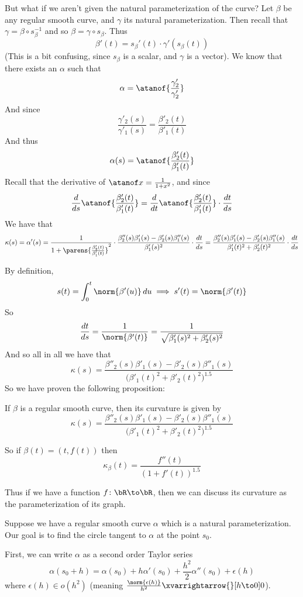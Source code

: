 But what if we aren't given the natural parameterization of the curve?
Let $\beta$ be any regular smooth curve, and $\gamma$ its natural parameterization.
Then recall that $\gamma=\beta\circ s_\beta^{-1}$ and so $\beta=\gamma\circ s_\beta$.
Thus
\[ \beta'(t) = s_\beta'(t)\cdot\gamma'(s_\beta(t)) \]
(This is a bit confusing, since $s_\beta$ is a scalar, and $\gamma$ is a vector).
We know that there exists an $\alpha$ such that
\[ \alpha = \atanof{\frac{\gamma'_2}{\gamma'_2}} \]
And since
\[ \frac{\gamma'_2(s)}{\gamma'_1(s)} = \frac{\beta'_2(t)}{\beta'_1(t)} \]
And thus
\[ \alpha(s) = \atanof{\frac{\beta'_2(t)}{\beta'_1(t)}} \]
Recall that the derivative of $\atanof x=\frac1{1+x^2}$, and since
\[ \frac d{ds}\atanof{\frac{\beta'_2(t)}{\beta'_1(t)}} = \frac d{dt}\atanof{\frac{\beta'_2(t)}{\beta'_1(t)}}\cdot\frac{dt}{ds} \]
We have that
\[ \kappa(s) = \alpha'(s) = \frac1{1+\parens{\frac{\beta'_2(t)}{\beta'_1(t)}}^2}\cdot\frac{\beta''_2(s)\beta'_1(s)-\beta'_2(s)\beta''_1(s)}{\beta'_1(s)^2}\cdot\frac{dt}{ds} =
\frac{\beta''_2(s)\beta'_1(s)-\beta'_2(s)\beta''_1(s)}{\beta'_1(t)^2+\beta'_2(t)^2}\cdot\frac{dt}{ds} \]

By definition,
\[ s(t) = \int_0^t \norm{\beta'(u)}\,du \implies s'(t) = \norm{\beta'(t)} \]
So
\[ \frac{dt}{ds} = \frac1{\norm{\beta'(t)}} = \frac1{\sqrt{\beta'_1(s)^2+\beta_2'(s)^2}} \]
And so all in all we have that
\[ \kappa(s) = \frac{\beta''_2(s)\beta'_1(s)-\beta'_2(s)\beta''_1(s)}{\bigl(\beta'_1(t)^2+\beta'_2(t)^2\bigr)^{1.5}} \]
So we have proven the following proposition:

\begin{prop*}

    If $\beta$ is a regular smooth curve, then its curvature is given by
    \[ \kappa(s) = \frac{\beta''_2(s)\beta'_1(s)-\beta'_2(s)\beta''_1(s)}{\bigl(\beta'_1(t)^2+\beta'_2(t)^2\bigr)^{1.5}} \]

\end{prop*}

\begin{exam*}

    So if $\beta(t)=(t,f(t))$ then
    \[ \kappa_\beta(t) = \frac{f''(t)}{(1+f'(t))^{1.5}} \]

    Thus if we have a function $f\colon\bR\to\bR$, then we can discuss its curvature as the parameterization of its graph.

\end{exam*}

Suppose we have a regular smooth curve $\alpha$ which is a natural parameterization.
Our goal is to find the circle tangent to $\alpha$ at the point $s_0$.
\benum
    \item First, we can write $\alpha$ as a second order Taylor series
    \[ \alpha(s_0+h) = \alpha(s_0) + h\alpha'(s_0) + \frac{h^2}2\alpha''(s_0) + \epsilon(h) \]
    where $\epsilon(h)\in o(h^2)$ (meaning $\frac{\norm{\epsilon(h)}}{h^2}\xvarrightarrow{}[h\to0]0$).

